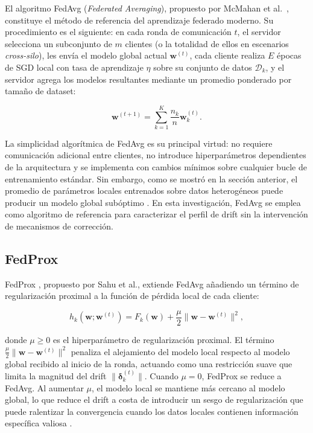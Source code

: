 El algoritmo FedAvg (\textit{Federated Averaging}), propuesto por McMahan et al.\
\cite{DBLP:journals/corr/McMahanMRA16}, constituye el método de referencia del aprendizaje
federado moderno. Su procedimiento es el siguiente: en cada ronda de comunicación $t$, el
servidor selecciona un subconjunto de $m$ clientes (o la totalidad de ellos en escenarios
\textit{cross-silo}), les envía el modelo global actual $\mathbf{w}^{(t)}$, cada cliente
realiza $E$ épocas de SGD local con tasa de aprendizaje $\eta$ sobre su conjunto de datos
$\mathcal{D}_k$, y el servidor agrega los modelos resultantes mediante un promedio ponderado
por tamaño de dataset:

\begin{equation}
  \mathbf{w}^{(t+1)} = \sum_{k=1}^{K} \frac{n_k}{n} \mathbf{w}_k^{(t)}.
  \label{eq:fedavg}
\end{equation}

La simplicidad algorítmica de FedAvg es su principal virtud: no requiere comunicación adicional
entre clientes, no introduce hiperparámetros dependientes de la arquitectura y se implementa
con cambios mínimos sobre cualquier bucle de entrenamiento estándar. Sin embargo, como se
mostró en la sección anterior, el promedio de parámetros locales entrenados sobre datos
heterogéneos puede producir un modelo global subóptimo \cite{li2020convergencefedavgnoniiddata}.
En esta investigación, FedAvg se emplea como algoritmo de referencia para caracterizar el
perfil de drift sin la intervención de mecanismos de corrección.

\subsection{FedProx}

\sloppy FedProx \cite{DBLP:journals/corr/abs-1812-06127}, propuesto por Sahu et al., extiende FedAvg
añadiendo un término de regularización proximal a la función de pérdida local de cada cliente:

\begin{equation}
  h_k(\mathbf{w}; \mathbf{w}^{(t)}) = F_k(\mathbf{w}) + \frac{\mu}{2}
  \|\mathbf{w} - \mathbf{w}^{(t)}\|^2,
  \label{eq:fedprox}
\end{equation}

donde $\mu \geq 0$ es el hiperparámetro de regularización proximal. El término
$\frac{\mu}{2}\|\mathbf{w} - \mathbf{w}^{(t)}\|^2$ penaliza el alejamiento del modelo
local respecto al modelo global recibido al inicio de la ronda, actuando como una restricción
suave que limita la magnitud del drift $\|\boldsymbol{\delta}_k^{(t)}\|$. Cuando $\mu = 0$,
FedProx se reduce a FedAvg. Al aumentar $\mu$, el modelo local se mantiene más cercano al
modelo global, lo que reduce el drift a costa de introducir un sesgo de regularización que
puede ralentizar la convergencia cuando los datos locales contienen información específica
valiosa \cite{DBLP:journals/corr/abs-1812-06127}.

